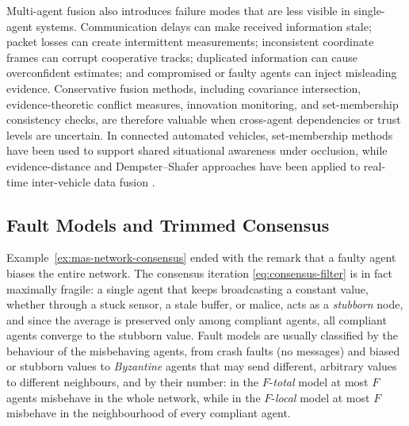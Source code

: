Multi-agent fusion also introduces failure modes that are less visible in single-agent systems. Communication delays can make received information stale; packet losses can create intermittent measurements; inconsistent coordinate frames can corrupt cooperative tracks; duplicated information can cause overconfident estimates; and compromised or faulty agents can inject misleading evidence. Conservative fusion methods, including covariance intersection, evidence-theoretic conflict measures, innovation monitoring, and set-membership consistency checks, are therefore valuable when cross-agent dependencies or trust levels are uncertain. In connected automated vehicles, set-membership methods have been used to support shared situational awareness under occlusion, while evidence-distance and Dempster--Shafer approaches have been applied to real-time inter-vehicle data fusion \cite{narri2021_set_membership_shared_awareness,cho_realtime_2020}.

\subsection{Fault Models and Trimmed Consensus}
\label{subsec:mas-wmsr}

Example~\ref{ex:mas-network-consensus} ended with the remark that a faulty agent biases the entire network. The consensus iteration \eqref{eq:consensus-filter} is in fact maximally fragile: a single agent that keeps broadcasting a constant value, whether through a stuck sensor, a stale buffer, or malice, acts as a \emph{stubborn} node, and since the average is preserved only among compliant agents, all compliant agents converge to the stubborn value. Fault models are usually classified by the behaviour of the misbehaving agents, from crash faults (no messages) and biased or stubborn values to \emph{Byzantine} agents that may send different, arbitrary values to different neighbours, and by their number: in the $F$-\emph{total} model at most $F$ agents misbehave in the whole network, while in the $F$-\emph{local} model at most $F$ misbehave in the neighbourhood of every compliant agent.

